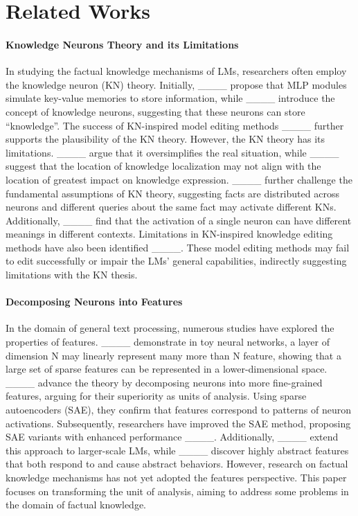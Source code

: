 \section{Related Works}
\paragraph{Knowledge Neurons Theory and its Limitations}
In studying the factual knowledge mechanisms of LMs, researchers often employ the knowledge neuron (KN) theory. Initially, ____ propose that MLP modules simulate key-value memories to store information, while ____ introduce the concept of knowledge neurons, suggesting that these neurons can store ``knowledge''. The success of KN-inspired model editing methods ____ further supports the plausibility of the KN theory. However, the KN theory has its limitations. ____ argue that it oversimplifies the real situation, while ____ suggest that the location of knowledge localization may not align with the location of greatest impact on knowledge expression. 
____ further challenge the fundamental assumptions of KN theory, suggesting facts are distributed across neurons and different queries about the same fact may activate different KNs.
Additionally, ____ find that the activation of a single neuron can have different meanings in different contexts.
Limitations in KN-inspired knowledge editing methods have also been identified ____. These model editing methods may fail to edit successfully or impair the LMs' general capabilities, indirectly suggesting limitations with the KN thesis.
\paragraph{Decomposing Neurons into Features}
In the domain of general text processing, numerous studies have explored the properties of features. 
____ demonstrate in toy neural networks, a layer of dimension N may linearly represent many more than N feature, showing that a large set of sparse features can be represented in a lower-dimensional space.
____ advance the theory by decomposing neurons into more fine-grained features, arguing for their superiority as units of analysis. Using sparse autoencoders (SAE), they confirm that features correspond to patterns of neuron activations. Subsequently, researchers have improved the SAE method, proposing SAE variants with enhanced performance ____. Additionally, ____ extend this approach to larger-scale LMs, while ____ discover highly abstract features that both respond to and cause abstract behaviors.
However, research on factual knowledge mechanisms has not yet adopted the features perspective. This paper focuses on transforming the unit of analysis, aiming to address some problems in the domain of factual knowledge.

\vspace{-3mm}